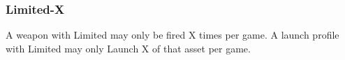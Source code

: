 \subsubsection{Limited-X}
A weapon with Limited may only be fired X times per game. A launch profile with Limited may only Launch X of that asset per game.